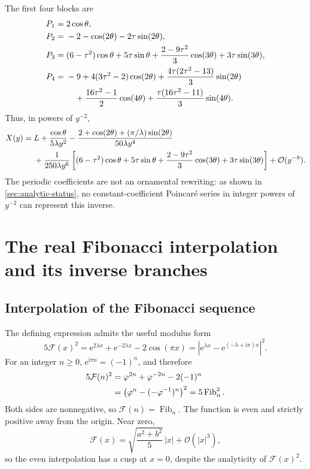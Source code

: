 \documentclass[11pt,oneside]{article}
\numberwithin{equation}{section}
\newcommand{\Fib}{\operatorname{Fib}}
\newcommand{\e}{\mathrm{e}}
\newcommand{\ii}{\mathrm{i}}
\newcommand{\cF}{\mathcal{F}}
\newcommand{\bigO}{\mathcal{O}}
\begin{document}
The first four blocks are
\begin{align}
P_1={}&2\cos\theta,
\label{eq:P1}\\
P_2={}&-2-\cos(2\theta)-2\tau\sin(2\theta),
\label{eq:P2}\\
P_3={}&(6-\tau^2)\cos\theta+5\tau\sin\theta
 +\frac{2-9\tau^2}{3}\cos(3\theta)+3\tau\sin(3\theta),
\label{eq:P3}\\
P_4={}&-9+4(3\tau^2-2)\cos(2\theta)
 +\frac{4\tau(2\tau^2-13)}3\sin(2\theta)\notag\\
&\quad+\frac{16\tau^2-1}{2}\cos(4\theta)
 +\frac{\tau(16\tau^2-11)}3\sin(4\theta).
\label{eq:P4}
\end{align}
Thus, in powers of \(y^{-2}\),
\begin{align}
X(y)={}&L+\frac{\cos\theta}{5\lambda y^2}
 -\frac{2+\cos(2\theta)+(\pi/\lambda)\sin(2\theta)}{50\lambda y^4}
\notag\\
&+\frac{1}{250\lambda y^6}
 \left[
 (6-\tau^2)\cos\theta+5\tau\sin\theta
 +\frac{2-9\tau^2}{3}\cos(3\theta)+3\tau\sin(3\theta)
 \right]
 +\bigO(y^{-8}).
\label{eq:main-y-expansion}
\end{align}
The periodic coefficients are not an ornamental rewriting: as shown in
\cref{sec:analytic-status}, no constant-coefficient Poincar\'e series in
integer powers of \(y^{-2}\) can represent this inverse.

\section{The real Fibonacci interpolation and its inverse branches}
\label{sec:branches}

\subsection{Interpolation of the Fibonacci sequence}

The defining expression admits the useful modulus form
\begin{equation}
  5\cF(x)^2
  =\e^{2\lambda x}+\e^{-2\lambda x}-2\cos(\pi x)
  =\left|\e^{\lambda x}-\e^{(-\lambda+\ii\pi)x}\right|^2.
  \label{eq:modulus-form}
\end{equation}
For an integer \(n\ge0\), \(\e^{\ii\pi n}=(-1)^n\), and therefore
\begin{align}
  5\cF(n)^2
  &=\varphi^{2n}+\varphi^{-2n}-2(-1)^n\notag\\
  &=\left(\varphi^n-(-\varphi^{-1})^n\right)^2
   =5\Fib_n^2.
  \label{eq:integer-interpolation}
\end{align}
Both sides are nonnegative, so \(\cF(n)=\Fib_n\).  The function is even and
strictly positive away from the origin.  Near zero,
\begin{equation}
  \cF(x)=\sqrt{\frac{a^2+b^2}{5}}\,|x|+\bigO(|x|^3),
  \label{eq:cusp}
\end{equation}
so the even interpolation has a cusp at \(x=0\), despite the analyticity of
\(\cF(x)^2\).
\end{document}
